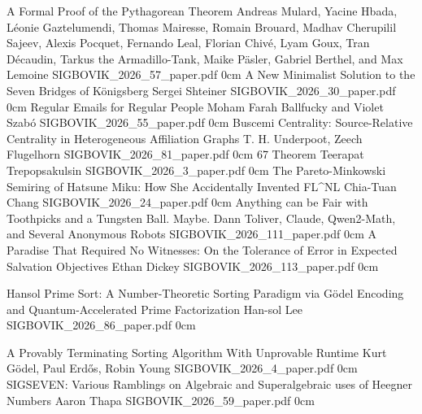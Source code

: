 \addpaper
	{A Formal Proof of the Pythagorean Theorem}
	{Andreas Mulard, Yacine Hbada, Léonie Gaztelumendi, Thomas Mairesse, Romain Brouard, Madhav Cherupilil Sajeev, Alexis Pocquet, Fernando Leal, Florian Chivé, Lyam Goux, Tran Décaudin, Tarkus the Armadillo-Tank, Maike Päsler, Gabriel Berthel, and Max Lemoine}
	{}
	{SIGBOVIK_2026_57_paper.pdf}
	{0cm}
	{}
\addpaper
	{A New Minimalist Solution to the Seven Bridges of Königsberg}
	{Sergei Shteiner}
	{}
	{SIGBOVIK_2026_30_paper.pdf}
	{0cm}
	{}
\addpaper
	{Regular Emails for Regular People}
	{Moham Farah Ballfucky and Violet Szabó}
	{}
	{SIGBOVIK_2026_55_paper.pdf}
	{0cm}
	{}
\addpaper
	{Buscemi Centrality: Source-Relative Centrality in Heterogeneous Affiliation Graphs}
	{T. H. Underpoot, Zeech Flugelhorn}
	{}
	{SIGBOVIK_2026_81_paper.pdf}
	{0cm}
	{}
\addpaper
	{67 Theorem}
	{Teerapat Trepopsakulsin}
	{}
	{SIGBOVIK_2026_3_paper.pdf}
	{0cm}
	{}
\addpaper
	{The Pareto-Minkowski Semiring of Hatsune Miku: How She Accidentally Invented FL^{NL}}
	{Chia-Tuan Chang}
	{}
	{SIGBOVIK_2026_24_paper.pdf}
	{0cm}
	{}
\addpaper
	{Anything can be Fair with Toothpicks and a Tungsten Ball. Maybe.}
	{Dann Toliver, Claude, Qwen2-Math, and Several Anonymous Robots}
	{}
	{SIGBOVIK_2026_111_paper.pdf}
	{0cm}
	{}
\addpaper
	{A Paradise That Required No Witnesses: On the Tolerance of Error in Expected Salvation Objectives}
	{Ethan Dickey}
	{}
	{SIGBOVIK_2026_113_paper.pdf}
	{0cm}
	{}

\addpaper
	{Hansol Prime Sort: A Number-Theoretic Sorting Paradigm via Gödel Encoding and Quantum-Accelerated Prime Factorization}
	{Han-sol Lee}
	{}
	{SIGBOVIK_2026_86_paper.pdf}
	{0cm}
	{}

\addpaper
	{A Provably Terminating Sorting Algorithm With Unprovable Runtime}
	{Kurt Gödel, Paul Erdős, Robin Young}
	{}
	{SIGBOVIK_2026_4_paper.pdf}
	{0cm}
	{}
\addpaper
	{SIGSEVEN: Various Ramblings on Algebraic and Superalgebraic uses of Heegner Numbers}
	{Aaron Thapa}
	{}
	{SIGBOVIK_2026_59_paper.pdf}
	{0cm}
	{}




